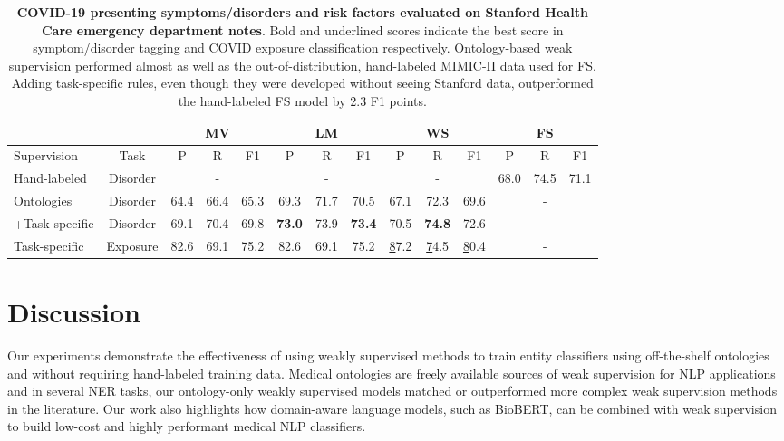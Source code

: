 \documentclass{article}
\begin{document}
\begin{table}[H]
\centering
\begin{tabular}{|l|c|c|c|c|c|c|c|c|c|c|c|c|c|} 
\hline
\multicolumn{1}{|c|}{\textbf{}} & \multicolumn{1}{c|}{ } & \multicolumn{3}{c|}{MV} & \multicolumn{3}{c|}{LM} & \multicolumn{3}{c|}{{WS}} & \multicolumn{3}{c|}{{FS}} \\ 
\hline
{Supervision} & {Task} & {P}  & {R} & {F1} & {P} & {R} & {F1} & {P} & {R} & {F1} & {P} & {R} & {F1}\\
\hline
Hand-labeled      &  Disorder &  & - & & & - &  & &  - & & 68.0 & 74.5 & 71.1           \\ 
\hline
Ontologies &  Disorder & 64.4 & 66.4 & 65.3 & 69.3 & 71.7 & 70.5 & 67.1 & 72.3 & 69.6 &  & - &  \\ 
+Task-specific &  Disorder & 69.1 & 70.4 & 69.8 & \textbf{73.0} & 73.9 & \textbf{73.4} & 70.5 & \textbf{74.8} & 72.6 & & - &  \\ 
\hline
Task-specific & Exposure & 82.6  & 69.1  & 75.2 & 82.6  & 69.1  & 75.2 & {\ul 87.2} & {\ul 74.5} & {\ul 80.4}  & & - & \\ 
\hline
\end{tabular}
\caption{\label{tbl:covid} \textbf{COVID-19 presenting symptoms/disorders and risk factors evaluated on Stanford Health Care emergency department notes}. Bold and underlined scores indicate the best score in symptom/disorder tagging and COVID exposure classification respectively. Ontology-based weak supervision performed almost as well as the out-of-distribution, hand-labeled MIMIC-II data used for FS. Adding task-specific rules, even though they were developed without seeing Stanford data, outperformed the hand-labeled FS model by 2.3 F1 points. }
\end{table}


\section*{Discussion}

Our experiments demonstrate the effectiveness of using weakly supervised methods to train entity classifiers using off-the-shelf ontologies and without requiring hand-labeled training data. 
Medical ontologies are freely available sources of weak supervision for NLP applications \cite{Rubin2008-vw} and in several NER tasks, our ontology-only weakly supervised models matched or outperformed more complex weak supervision methods in the literature. 
Our work also highlights how domain-aware language models, such as BioBERT, can be combined with weak supervision to build low-cost and highly performant medical NLP classifiers. 
\end{document}
